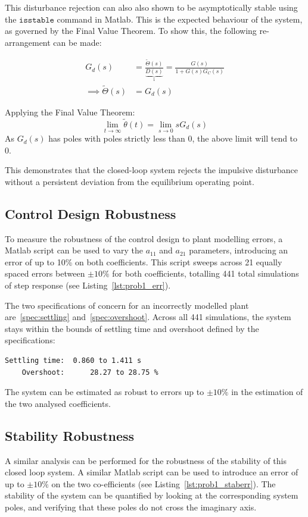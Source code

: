 \documentclass[11pt,a4paper]{article}
\begin{document}
This disturbance rejection can also also shown to be asymptotically stable using the $\texttt{isstable}$ command in Matlab. This is the expected behaviour of the system, as governed by the Final Value Theorem. To show this, the following re-arrangement can be made:

\begin{align*}
    G_d(s) &= \frac{\tilde{\Theta}(s)}{\underbrace{D(s)}_{1}} = \frac{G(s)}{1+G(s)G_C(s)} \\
    \implies \tilde{\Theta}(s) &= G_d(s)
\end{align*}

Applying the Final Value Theorem:
\[
    \lim_{t\to\infty}\tilde{\theta}(t) = \lim_{s\to0}sG_d(s)
\]
As $G_d(s)$ has poles with poles strictly less than 0, the above limit will tend to 0. 

This demonstrates that the closed-loop system rejects the impulsive disturbance without a persistent deviation from the equilibrium operating point.

\subsection{Control Design Robustness}
To measure the robustness of the control design to plant modelling errors, a Matlab script can be used to vary the $a_{11}$ and $a_{21}$ parameters, introducing an error of up to 10\% on both coefficients. This script sweeps across 21 equally spaced errors between $\pm10\%$ for both coefficients, totalling 441 total simulations of step response (see Listing~\ref{lst:prob1_err}). 

The two specifications of concern for an incorrectly modelled plant are~\ref{spec:settling} and~\ref{spec:overshoot}. Across all 441 simulations, the system stays within the bounds of settling time and overshoot defined by the specifications:
\par\noindent\begin{minipage}{\linewidth}
\begin{lstlisting}[style=outputstyle]
    Settling time:  0.860 to 1.411 s
    Overshoot:      28.27 to 28.75 % 
\end{lstlisting}
\end{minipage}\par
The system can be estimated as robust to errors up to $\pm10\%$ in the estimation of the two analysed coefficients.


\subsection{Stability Robustness}
A similar analysis can be performed for the robustness of the stability of this closed loop system. A similar Matlab script can be used to introduce an error of up to $\pm10\%$ on the two co-efficients (see Listing~\ref{lst:prob1_staberr}). The stability of the system can be quantified by looking at the corresponding system poles, and verifying that these poles do not cross the imaginary axis.
\end{document}
